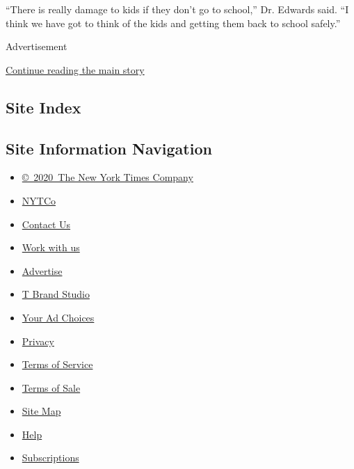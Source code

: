 ``There is really damage to kids if they don't go to school,'' Dr.
Edwards said. ``I think we have got to think of the kids and getting
them back to school safely.''

Advertisement

\protect\hyperlink{after-bottom}{Continue reading the main story}

\hypertarget{site-index}{%
\subsection{Site Index}\label{site-index}}

\hypertarget{site-information-navigation}{%
\subsection{Site Information
Navigation}\label{site-information-navigation}}

\begin{itemize}
\tightlist
\item
  \href{https://help.nytimes3xbfgragh.onion/hc/en-us/articles/115014792127-Copyright-notice}{©~2020~The
  New York Times Company}
\end{itemize}

\begin{itemize}
\tightlist
\item
  \href{https://www.nytco.com/}{NYTCo}
\item
  \href{https://help.nytimes3xbfgragh.onion/hc/en-us/articles/115015385887-Contact-Us}{Contact
  Us}
\item
  \href{https://www.nytco.com/careers/}{Work with us}
\item
  \href{https://nytmediakit.com/}{Advertise}
\item
  \href{http://www.tbrandstudio.com/}{T Brand Studio}
\item
  \href{https://www.nytimes3xbfgragh.onion/privacy/cookie-policy\#how-do-i-manage-trackers}{Your
  Ad Choices}
\item
  \href{https://www.nytimes3xbfgragh.onion/privacy}{Privacy}
\item
  \href{https://help.nytimes3xbfgragh.onion/hc/en-us/articles/115014893428-Terms-of-service}{Terms
  of Service}
\item
  \href{https://help.nytimes3xbfgragh.onion/hc/en-us/articles/115014893968-Terms-of-sale}{Terms
  of Sale}
\item
  \href{https://spiderbites.nytimes3xbfgragh.onion}{Site Map}
\item
  \href{https://help.nytimes3xbfgragh.onion/hc/en-us}{Help}
\item
  \href{https://www.nytimes3xbfgragh.onion/subscription?campaignId=37WXW}{Subscriptions}
\end{itemize}
